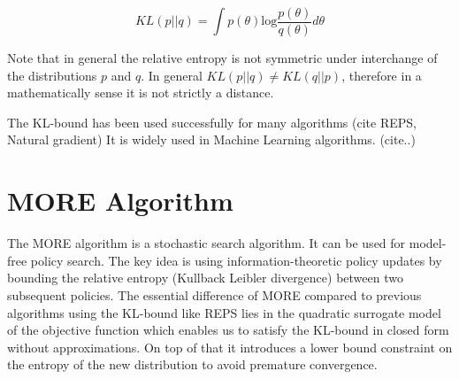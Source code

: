 $$ KL(p || q) = \int p(\theta) \text{log} \frac{p(\theta)}{q(\theta)} d \theta $$

Note that in general the relative entropy is not symmetric under interchange of the
distributions $p$ and $q$. In general $KL(p || q) \neq KL(q || p) $, therefore
in a mathematically sense it is not strictly a distance.

The KL-bound has been used successfully for many algorithms (cite REPS, Natural gradient)
It is widely used in Machine Learning algorithms. (cite..)


%
%
%
%
%
%

\section{MORE Algorithm}
The MORE algorithm is a stochastic search algorithm. It can be used for
model-free policy search. The key idea is
using information-theoretic policy updates
by bounding the relative entropy (Kullback Leibler divergence)
between two subsequent policies.
The essential difference of MORE compared to previous algorithms using
the KL-bound like REPS \citet{peters2010relative} lies in the quadratic
surrogate model of the objective function which enables us to 
satisfy the KL-bound in closed form without approximations. On top of that it
introduces a lower bound constraint on the entropy of the new distribution
to avoid premature convergence.

